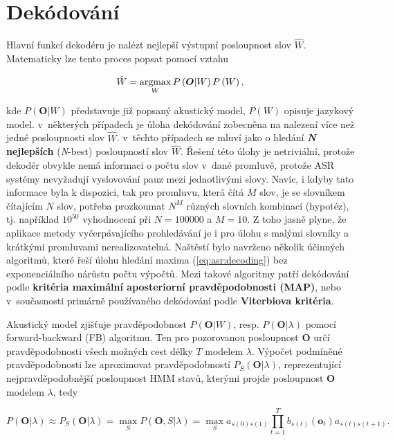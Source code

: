 \section{Dekódování}
\label{chap:asr:decoding}

Hlavní funkcí dekodéru je nalézt nejlepší výstupní posloupnost slov $\hat{W}$. Matematicky lze tento proces popsat pomocí vztahu

\begin{equation}
  \hat{W} = \operatorname*{argmax}_{W} P\left(\boldsymbol{O} | W\right)P\left(W\right),
  \label{eq:asr:decoding:decoder}
\end{equation}

\noindent kde $P\left(\boldsymbol{O}|W\right)$ představuje již popsaný akustický model, $P\left(W\right)$ opisuje jazykový model. v~některých případech je úloha dekódování zobecněna na nalezení více než jedné posloupnosti slov $\hat{W}$. v~těchto případech se mluví jako o hledání \textbf{\textit{N} nejlepších} (\textit{N}-best) posloupností slov $\hat{W}$.  Řešení této úlohy je netriviální, protože dekodér obvykle nemá informaci o počtu slov v~dané promluvě, protože ASR systémy nevyžadují vyslovování pauz mezi jednotlivými slovy. Navíc, i kdyby tato informace byla k dispozici, tak pro promluvu, která čítá $M$ slov, je se slovníkem čítajícím $N$ slov, potřeba prozkoumat $N^{M}$ různých slovních kombinací (hypotéz), tj. například $10^{50}$ vyhodnocení při $N=100000$ a $M=10$. Z toho jasně plyne, že aplikace metody vyčerpávajícího prohledávání je i pro úlohu s malými slovníky a krátkými promluvami nerealizovatelná.
Naštěstí bylo navrženo několik účinných algoritmů, které řeší úlohu hledání maxima (\ref{eq:asr:decoding}) bez exponenciálního nárůstu počtu výpočtů. Mezi takové algoritmy patří dekódování podle \textbf{kritéria maximální aposteriorní pravděpodobnosti (MAP)}, nebo v~současnosti primárně používaného dekódování podle \textbf{Viterbiova kritéria}.

Akustický model zjišťuje pravděpodobnost $P\left(\boldsymbol{O}|W\right)$, resp. $P\left(\boldsymbol{O}|\lambda\right)$ pomocí forward-backward (FB) algoritmu.
Ten pro pozorovanou posloupnost $\boldsymbol{O}$ určí pravděpodobnosti všech možných cest délky $T$ modelem $\lambda$.
Výpočet podmíněné pravděpodobnosti lze aproximovat pravděpodobností $P_S(\boldsymbol{O}|\lambda)$, reprezentující nejpravděpodobnější posloupnost HMM stavů, kterými projde posloupnost $\boldsymbol{O}$ modelem $\lambda$, tedy

\begin{equation}
  P\left(\boldsymbol{O}|\lambda\right) \approx P_S\left(\boldsymbol{O}|\lambda\right) = \max_S P\left(\boldsymbol{O}, S| \lambda \right) = \max_S a_{s\left(0\right)s\left(1\right)} \prod_{t=1}^{T} b_{s\left(t\right)}\left(\boldsymbol{o}_t\right) a_{s\left(t\right)s\left(t+1\right)}.
  \label{eq:asr:decoding:approx}
\end{equation}

